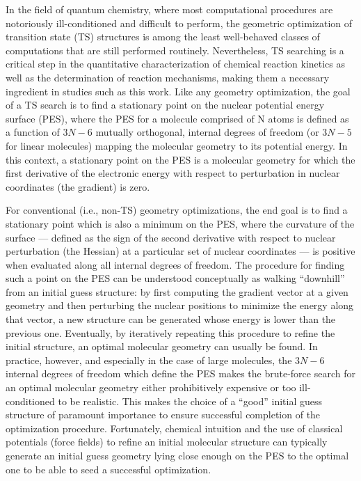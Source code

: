 \documentclass[aip,jcp,preprint,superscriptaddress,floatfix]{revtex4-1}
\begin{document}
In the field of quantum chemistry, where most computational procedures are
notoriously ill-conditioned and difficult to perform, the geometric
optimization of transition state (TS) structures is among the least
well-behaved classes of computations that are still performed routinely.
Nevertheless, TS searching is a critical step in the quantitative
characterization of chemical reaction kinetics as well as the determination of
reaction  mechanisms, making them a necessary ingredient in studies such as
this work.  Like any geometry optimization, the goal of a TS search is to find
a stationary point on the nuclear potential energy surface (PES), where the PES
for a molecule comprised of N atoms is defined as a function of $3N-6$ mutually
orthogonal, internal degrees of freedom (or $3N-5$ for linear molecules)
mapping the molecular geometry to its potential energy.  In this context, a
stationary point on the PES is a molecular geometry for which the first
derivative of the electronic energy with respect to perturbation in nuclear
coordinates (the gradient) is zero.  

For conventional (i.e., non-TS) geometry optimizations, the end goal is to find
a stationary point which is also a minimum on the PES, where the curvature of
the surface --- defined as the sign of the second derivative with respect to
nuclear perturbation (the Hessian) at a particular set of nuclear coordinates
--- is positive when evaluated along all internal degrees of freedom.  The
procedure for finding such a point on the PES can be understood conceptually as
walking ``downhill'' from an initial guess structure: by first computing the
gradient vector at a given geometry and then perturbing the nuclear positions
to minimize the energy along that vector, a new structure can be generated
whose energy is lower than the previous one. Eventually, by iteratively
repeating this procedure to refine the initial structure, an optimal molecular
geometry can usually be found.  In practice, however, and especially in the
case of large molecules, the $3N-6$ internal degrees of freedom which define
the PES makes the brute-force search for an optimal molecular geometry either
prohibitively expensive or too ill-conditioned to be realistic. This makes the
choice of a ``good'' initial guess structure of paramount importance to ensure
successful completion of the optimization procedure.\cite{tschallenge}
Fortunately, chemical intuition and the use of classical potentials (force
fields) to refine an initial molecular structure can typically generate an
initial guess geometry lying close enough on the PES to the optimal one to be
able to seed a successful optimization.  
\end{document}
